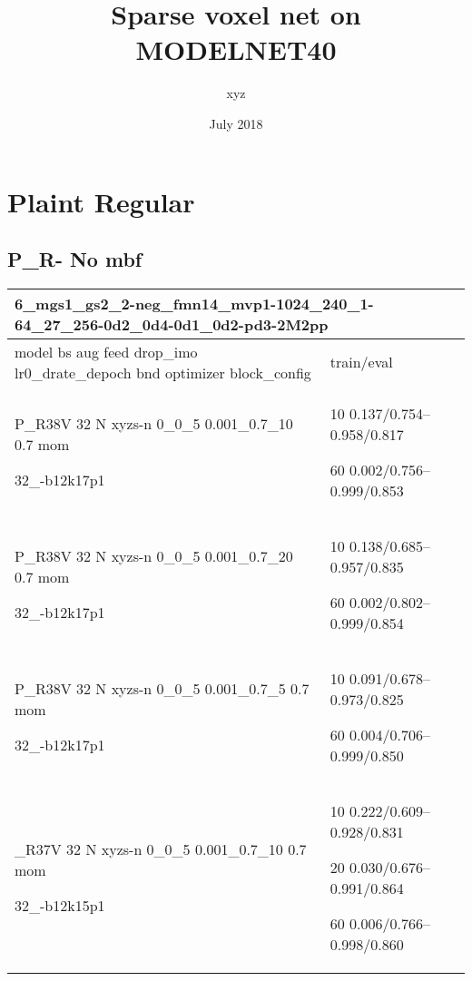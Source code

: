 \documentclass[,table,dvipsnames]{article}
\title{Sparse voxel net on MODELNET40}
\author{xyz}
\date{July 2018}
\begin{document}
\noindent
\begin{titlepage}
	\maketitle
\end{titlepage}	

\tableofcontents{}

\section{Plaint Regular}
\subsection{P\_R- No mbf}
\noindent\begin{tabular}{|p{10cm}|p{5cm}| }	
	\hline
	\multicolumn{2}{|p{15cm}|}{ 6\_mgs1\_gs2\_2-neg\_fmn14\_mvp1-1024\_240\_1-64\_27\_256-0d2\_0d4-0d1\_0d2-pd3-2M2pp}\\
	\hline
	model bs aug feed drop\_imo lr0\_drate\_depoch bnd optimizer block\_config & train/eval \\
	
	\rowcolor{red!20}
	P\_R38V 32 N xyzs-n 0\_0\_5 0.001\_0.7\_10 0.7 mom \par 32\_-b12k17p1& 10 0.137/0.754--0.958/0.817\par 60 0.002/0.756--0.999/0.853\\
	
	\rowcolor{green!20}
	P\_R38V 32 N xyzs-n 0\_0\_5 0.001\_0.7\_20 0.7 mom \par 32\_-b12k17p1 &10 0.138/0.685--0.957/0.835\par 60 0.002/0.802--0.999/0.854\\
	
	\rowcolor{orange!20}
	P\_R38V 32 N xyzs-n 0\_0\_5 0.001\_0.7\_5 0.7 mom \par 32\_-b12k17p1& 10 0.091/0.678--0.973/0.825\par 60 0.004/0.706--0.999/0.850\\
	
	\rowcolor{blue!20}
	\_R37V 32 N xyzs-n 0\_0\_5 0.001\_0.7\_10 0.7 mom \par 32\_-b12k15p1& 10 0.222/0.609--0.928/0.831\par 20 0.030/0.676--0.991/0.864\par 60 0.006/0.766--0.998/0.860\\
	
	\hline 
\end{tabular}
\end{document}

